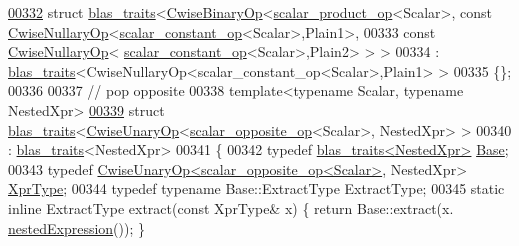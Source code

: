 \begin{DoxyCode}
\hyperlink{struct_eigen_1_1internal_1_1blas__traits_3_01_cwise_binary_op_3_01scalar__product__op_3_01_scala720e6aa72051d527ea4818c5301d9b21}{00332} \textcolor{keyword}{struct }\hyperlink{struct_eigen_1_1internal_1_1blas__traits}{blas\_traits}<\hyperlink{group___core___module_class_eigen_1_1_cwise_binary_op}{CwiseBinaryOp}<\hyperlink{struct_eigen_1_1internal_1_1scalar__product__op}{scalar\_product\_op}<Scalar>, const 
      \hyperlink{group___core___module_class_eigen_1_1_cwise_nullary_op}{CwiseNullaryOp}<\hyperlink{struct_eigen_1_1internal_1_1scalar__constant__op}{scalar\_constant\_op}<Scalar>,Plain1>,
00333                                                             const \hyperlink{group___core___module_class_eigen_1_1_cwise_nullary_op}{CwiseNullaryOp}<
      \hyperlink{struct_eigen_1_1internal_1_1scalar__constant__op}{scalar\_constant\_op}<Scalar>,Plain2> > >
00334  : \hyperlink{struct_eigen_1_1internal_1_1blas__traits}{blas\_traits}<CwiseNullaryOp<scalar\_constant\_op<Scalar>,Plain1> >
00335 \{\};
00336 
00337 \textcolor{comment}{// pop opposite}
00338 \textcolor{keyword}{template}<\textcolor{keyword}{typename} Scalar, \textcolor{keyword}{typename} NestedXpr>
\hyperlink{struct_eigen_1_1internal_1_1blas__traits_3_01_cwise_unary_op_3_01scalar__opposite__op_3_01_scalabef74274251827708a3725df034ebf7d}{00339} \textcolor{keyword}{struct }\hyperlink{struct_eigen_1_1internal_1_1blas__traits}{blas\_traits}<\hyperlink{group___core___module_class_eigen_1_1_cwise_unary_op}{CwiseUnaryOp}<\hyperlink{struct_eigen_1_1internal_1_1scalar__opposite__op}{scalar\_opposite\_op}<Scalar>, 
      NestedXpr> >
00340  : \hyperlink{struct_eigen_1_1internal_1_1blas__traits}{blas\_traits}<NestedXpr>
00341 \{
00342   \textcolor{keyword}{typedef} \hyperlink{struct_eigen_1_1internal_1_1blas__traits}{blas\_traits<NestedXpr>} \hyperlink{struct_eigen_1_1internal_1_1blas__traits}{Base};
00343   \textcolor{keyword}{typedef} \hyperlink{group___core___module_class_eigen_1_1_cwise_unary_op}{CwiseUnaryOp<scalar\_opposite\_op<Scalar>}, NestedXpr> 
      \hyperlink{group___core___module_class_eigen_1_1_cwise_unary_op}{XprType};
00344   \textcolor{keyword}{typedef} \textcolor{keyword}{typename} Base::ExtractType ExtractType;
00345   \textcolor{keyword}{static} \textcolor{keyword}{inline} ExtractType extract(\textcolor{keyword}{const} XprType& x) \{ \textcolor{keywordflow}{return} Base::extract(x.
      \hyperlink{group___core___module_a25d4402be360cf0b8ff867863da46c7d}{nestedExpression}()); \}

\end{DoxyCode}
